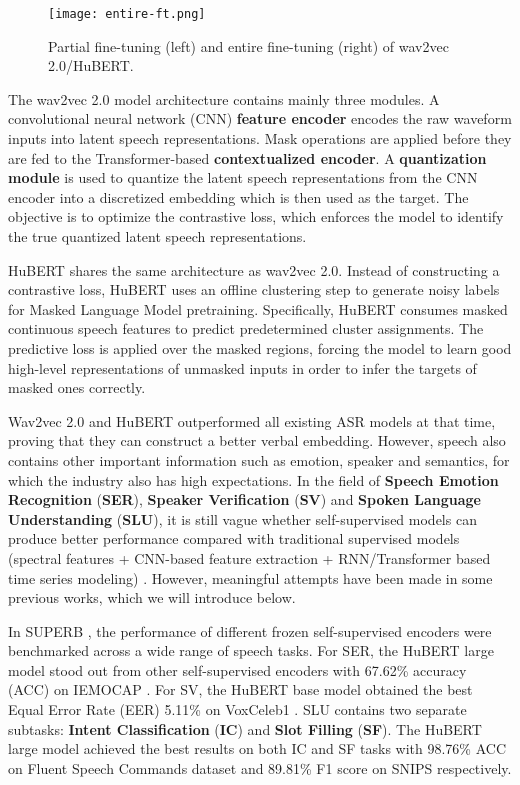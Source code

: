 \documentclass{article}
\begin{document}
\begin{figure*}[t]
  \centering
  \texttt{[image: entire-ft.png]}
  \caption{Partial fine-tuning (left) and entire fine-tuning (right) of wav2vec 2.0/HuBERT.}
  \label{fig:speech_production}
\end{figure*}

The wav2vec 2.0 model architecture contains mainly three modules. A convolutional neural network (CNN) \textbf{feature encoder} encodes the raw waveform inputs into latent speech representations. Mask operations are applied before they are fed to the Transformer-based \textbf{contextualized encoder}. A \textbf{quantization module} is used to quantize the latent speech representations from the CNN encoder into a discretized embedding which is then used as the target. The objective is to optimize the contrastive loss, which enforces the model to identify the true quantized latent speech representations.

HuBERT shares the same architecture as wav2vec 2.0. Instead of constructing a contrastive loss, HuBERT uses an offline clustering step to generate noisy labels for Masked Language Model pretraining. Specifically, HuBERT consumes masked continuous speech features to predict predetermined cluster assignments. The predictive loss is applied over the masked regions, forcing the model to learn good high-level representations of unmasked inputs in order to infer the targets of masked ones correctly.

Wav2vec 2.0 and HuBERT outperformed all existing ASR models at that time, proving that they can construct a better verbal embedding. However, speech also contains other important information such as emotion, speaker and semantics, for which the industry also has high expectations. In the field of \textbf{Speech Emotion Recognition} (\textbf{SER}), \textbf{Speaker Verification} (\textbf{SV}) and \textbf{Spoken Language Understanding} (\textbf{SLU}), it is still vague whether self-supervised models can produce better performance compared with traditional supervised models (spectral features + CNN-based feature extraction + RNN/Transformer based time series modeling) \cite{tr-emo-1, tr-emo-2, tr-sv-1, tr-sv-2, tr-slu-1}. However, meaningful attempts have been made in some previous works, which we will introduce below.

In SUPERB \cite{superb}, the performance of different frozen self-supervised encoders were benchmarked across a wide range of speech tasks. For SER, the HuBERT large model stood out from other self-supervised encoders with 67.62\% accuracy (ACC) on IEMOCAP \cite{IEMOCAP}. For SV, the HuBERT base model obtained the best Equal Error Rate (EER) 5.11\% on VoxCeleb1 \cite{VoxCeleb}. SLU contains two separate subtasks: \textbf{Intent Classification} (\textbf{IC}) and \textbf{Slot Filling}   (\textbf{SF}). The HuBERT large model achieved the best results on both IC and SF tasks with 98.76\% ACC on Fluent Speech Commands dataset \cite{FSC} and 89.81\% F1 score on SNIPS \cite{SNIPS} respectively.
\end{document}
